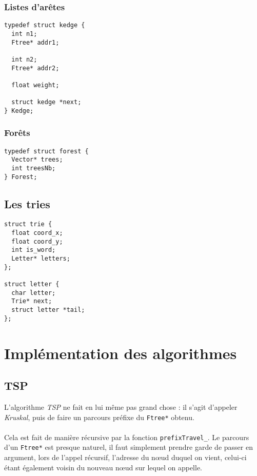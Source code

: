 \documentclass[a4paper]{article}
\begin{document}
\subsubsection{Listes d'arêtes}

\begin{verbatim}
typedef struct kedge {
  int n1;
  Ftree* addr1;

  int n2;
  Ftree* addr2;

  float weight;

  struct kedge *next;
} Kedge;
\end{verbatim}

\subsubsection{Forêts}

\begin{verbatim}
typedef struct forest {
  Vector* trees;
  int treesNb;
} Forest;
\end{verbatim}

\subsection{Les tries}

\begin{verbatim}
struct trie {
  float coord_x;
  float coord_y;
  int is_word;
  Letter* letters;
};

struct letter {
  char letter;
  Trie* next;
  struct letter *tail;
};
\end{verbatim}

\section{Implémentation des algorithmes}

\subsection{TSP}
L'algorithme \emph{TSP} ne fait en lui même pas grand chose : il s'agit d'appeler \emph{Kruskal}, puis de faire un parcours préfixe du \texttt{Ftree*} obtenu.

\paragraph*{}
Cela est fait de manière récursive par la fonction \texttt{prefixTravel\_}. Le parcours d'un \texttt{Ftree*} est presque naturel, il faut simplement prendre garde de passer en argument, lors de l'appel récursif, l'adresse du nœud duquel on vient, celui-ci étant également voisin du nouveau nœud sur lequel on appelle.
\end{document}

